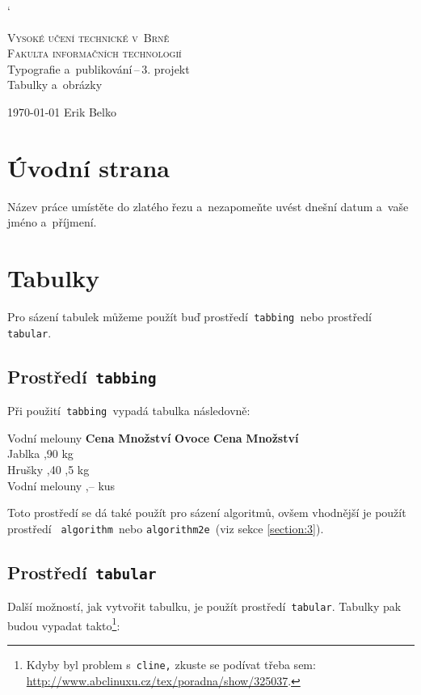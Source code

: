 \documentclass[a4paper, 11pt]{article}[23.3.2020]
\begin{document}
\catcode`

\begin{titlepage}
	\begin{center}
		\Huge \textsc{Vysoké učení technické v~Brně}\\
		\huge \textsc{Fakulta informačních technologií}\\
		\LARGE Typografie a~publikování\,--\,3. projekt\\
		\Huge Tabulky a~obrázky
	\end{center}
	{\Large \today
		\hfill
	Erik Belko }
\end{titlepage}

\section{Úvodní strana}
Název práce umístěte do zlatého řezu a~nezapomeňte uvést dnešní datum a~vaše jméno a~příjmení.

\section{Tabulky}
Pro sázení tabulek můžeme použít buď prostředí\verb| tabbing |nebo prostředí\verb| tabular|.

\subsection{Prostředí\texttt{ tabbing}}
Při použití\verb| tabbing |vypadá tabulka následovně:

\begin{tabbing}
    Vodní melouny \quad	\= \textbf{Cena} \quad	\= \textbf{Množství} \kill
	\textbf{Ovoce} \> \textbf{Cena} \> \textbf{Množství} \\
	Jablka ,90  kg \\
	Hrušky ,40 ,5 kg \\
	Vodní melouny ,--  kus \\
\end{tabbing}
Toto prostředí se dá také použít pro sázení algoritmů, ovšem vhodnější je použít prostředí \verb| algorithm |nebo \verb|algorithm2e |(viz sekce \ref{section:3}).

\subsection{Prostředí\texttt{ tabular}}
Další možností, jak vytvořit tabulku, je použít prostředí\verb| tabular|. Tabulky pak budou vypadat takto\footnote{Kdyby byl problem s\texttt{ cline,} zkuste se podívat třeba sem: \url{http://www.abclinuxu.cz/tex/poradna/show/325037}.}:
\end{document}
